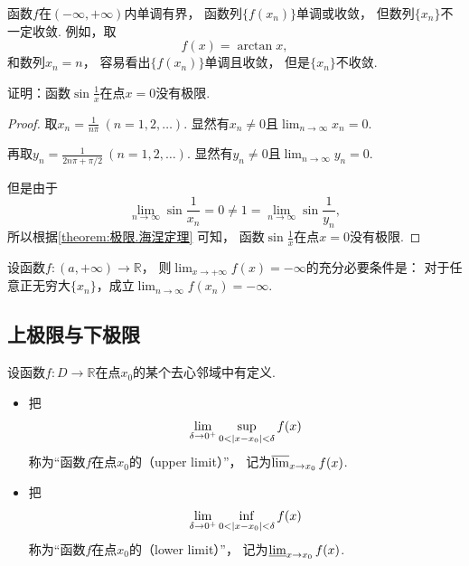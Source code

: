 \begin{example}
函数\(f\)在\((-\infty,+\infty)\)内单调有界，
函数列\(\{f(x_n)\}\)单调或收敛，
但数列\(\{x_n\}\)不一定收敛.
例如，取\begin{equation*}
	f(x) = \arctan x,
\end{equation*}
和数列\(x_n = n\)，
容易看出\(\{f(x_n)\}\)单调且收敛，
但是\(\{x_n\}\)不收敛.
\end{example}

\begin{example}
证明：函数\(\sin\frac1x\)在点\(x=0\)没有极限.
\begin{proof}
取\(x_n = \frac1{n\pi}\ (n=1,2,\dotsc)\).
显然有\(x_n\neq0\)且\(\lim_{n\to\infty} x_n = 0\).

再取\(y_n = \frac1{2n\pi+\pi/2}\ (n=1,2,\dotsc)\).
显然有\(y_n\neq0\)且\(\lim_{n\to\infty} y_n = 0\).

但是由于\begin{equation*}
	\lim_{n\to\infty} \sin\frac1{x_n} = 0
	\neq 1 = \lim_{n\to\infty} \sin\frac1{y_n},
\end{equation*}
所以根据\cref{theorem:极限.海涅定理} 可知，
函数\(\sin\frac1x\)在点\(x=0\)没有极限.
\end{proof}
\end{example}

\begin{theorem}
设函数\(f\colon (a,+\infty)\to\mathbb{R}\)，
则\(\lim_{x\to+\infty} f(x) = -\infty\)的充分必要条件是：
对于任意正无穷大\(\{x_n\}\)，成立\(\lim_{n\to\infty} f(x_n) = -\infty\).
\end{theorem}

\subsection{上极限与下极限}
\begin{definition}
设函数\(f\colon D\to\mathbb{R}\)在点\(x_0\)的某个去心邻域中有定义.
\begin{itemize}
	\item 把\begin{equation*}
		\lim_{\delta\to0^+} \sup_{0<\abs{x-x_0}<\delta} f(x)
	\end{equation*}
	称为“函数\(f\)在点\(x_0\)的（upper limit）”，
	记为\(\varlimsup_{x \to x_0} f(x)\).

	\item 把\begin{equation*}
		\lim_{\delta\to0^+} \inf_{0<\abs{x-x_0}<\delta} f(x)
	\end{equation*}
	称为“函数\(f\)在点\(x_0\)的（lower limit）”，
	记为\(\varliminf_{x \to x_0} f(x)\).
\end{itemize}
\end{definition}

